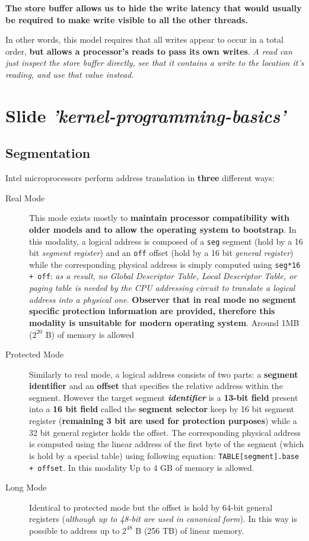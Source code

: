 \documentclass[10pt,a4paper]{article}
\begin{document}
\textbf{The store buffer allows us to hide the write latency that would usually be required to make write visible to all the other threads.}

In other words, this model requires that all writes appear to occur in a total order, \textbf{but allows a processor's reads to pass its own writes}. \textit{A read can just inspect the store buffer directly, see that it contains a write to the location it's reading, and use that value instead.}


\newpage
\section{Slide \textit{'kernel-programming-basics'}}

\subsection{Segmentation}

Intel microprocessors perform address translation in \textbf{three} different ways:
\begin{description}
\item[Real Mode] This mode exists mostly to \textbf{maintain processor compatibility with older models and to allow the operating system to bootstrap}. In this modality, a logical address is composed of a \texttt{seg} segment (hold by a 16 bit \textit{segment register}) and an \texttt{off} offset (hold by a 16 bit \textit{general register}) while the corresponding physical address is simply computed using \texttt{seg*16 + off}: \textit{as a result, no Global Descriptor Table, Local Descriptor Table, or paging table is needed by the CPU addressing circuit to translate a logical address into a physical one}. \textbf{Observer that in real mode no segment specific protection information are provided, therefore this modality is unsuitable for modern operating system}. Around 1MB ($2^20$ B) of memory is allowed
\item[Protected Mode] Similarly to real mode, a logical address consists of two parts: a \textbf{segment identifier} and an \textbf{offset} that specifies the relative address within the segment. However the target segment \textit{\textbf{identifier}} is a \textbf{13-bit field} present into a \textbf{16 bit field} called the \textbf{segment selector} keep by 16 bit segment register (\textbf{remaining 3 bit are used for protection purposes}) while a 32 bit general register holds the offset. The corresponding physical address is computed using the linear address of the first byte of the segment (which is hold by a special table) using following equation: \texttt{TABLE[segment].base + offset}. In this modality Up to 4 GB of memory is allowed.
\item[Long Mode] Identical to protected mode but the offset is hold by 64-bit general registers (\textit{although up to 48-bit are used in canonical form}). In this way is possible to address up to $2^{48}$ B (256 TB) of linear memory.
\end{description}
\end{document}
